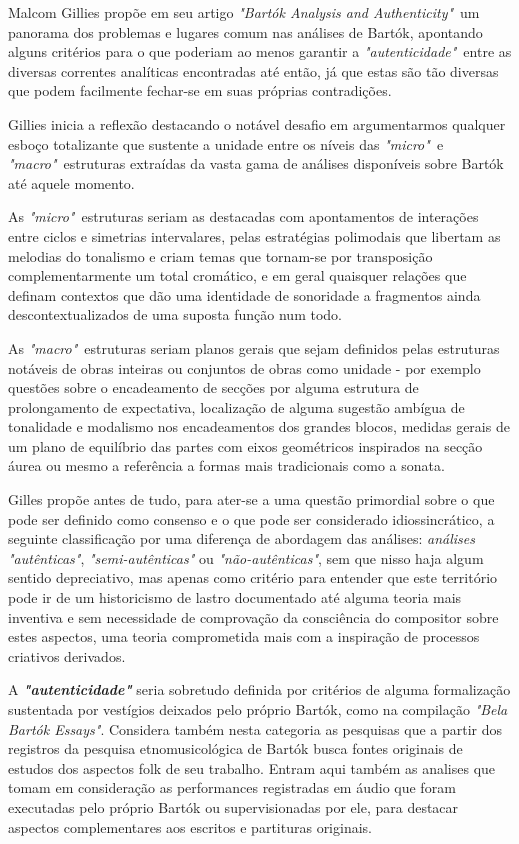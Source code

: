 \documentclass[
	12pt,				%
	openright,			%
	twoside,			%
	a4paper,			%
	english,			%
	french,				%
	spanish,			%
	brazil				%
	]{abntex2}
\begin{document}
Malcom Gillies propõe em seu artigo \textit{"Bartók Analysis and Authenticity"}\cite{gillies1995bartok}\ um panorama dos problemas e lugares comum nas análises de Bartók, apontando alguns critérios para o que poderiam ao menos garantir a \textit{"autenticidade"}\ entre as diversas correntes analíticas encontradas até então, já que estas são tão diversas que podem facilmente fechar-se em suas próprias contradições. 

Gillies inicia a reflexão destacando o notável desafio em argumentarmos qualquer esboço totalizante que sustente a unidade entre os níveis das \textit{ "micro"}\ e \textit{"macro"}\ estruturas extraídas da vasta gama de análises disponíveis sobre Bartók até aquele momento.

As \textit{ "micro"}\ estruturas seriam as destacadas com apontamentos de interações entre ciclos e simetrias intervalares, pelas estratégias polimodais que libertam as melodias do tonalismo e criam temas que tornam-se por transposição complementarmente um total cromático, e em geral quaisquer relações que definam contextos que dão uma identidade de sonoridade a fragmentos ainda descontextualizados de uma suposta função num todo. 

As \textit{"macro"}\ estruturas seriam planos gerais que sejam definidos pelas estruturas notáveis de obras inteiras ou conjuntos de obras como unidade - por exemplo questões sobre o encadeamento de secções por alguma estrutura de prolongamento de expectativa, localização de alguma sugestão ambígua de tonalidade e modalismo nos encadeamentos dos grandes blocos, medidas gerais de um plano de equilíbrio das partes com eixos geométricos inspirados na secção áurea ou mesmo a referência a formas mais tradicionais como a sonata.

Gilles propõe antes de tudo, para ater-se a uma questão primordial sobre o que pode ser definido como consenso e o que pode ser considerado idiossincrático, a seguinte classificação por uma diferença de abordagem das análises: \textit{análises "autênticas"}, \textit{"semi-autênticas"} ou \textit{"não-autênticas"}, sem que nisso haja algum sentido depreciativo, mas apenas como critério para entender que este território pode ir de um historicismo de lastro documentado até alguma teoria mais inventiva e sem necessidade de comprovação da consciência do compositor sobre estes aspectos, uma teoria comprometida mais com a inspiração de processos criativos derivados.

\pagebreak
A \textit{\textbf{"autenticidade"}} seria sobretudo definida por critérios de alguma formalização sustentada por vestígios deixados pelo próprio Bartók, como na compilação \textit{"Bela Bartók Essays"}\cite{bartok1993bela}. Considera também nesta categoria as pesquisas que a partir dos registros da pesquisa etnomusicológica de Bartók busca fontes originais de estudos dos aspectos folk de seu trabalho. Entram aqui também as analises que tomam em consideração as performances registradas em áudio que foram executadas pelo próprio Bartók ou supervisionadas por ele, para destacar aspectos complementares aos escritos e partituras originais. 
\end{document}
